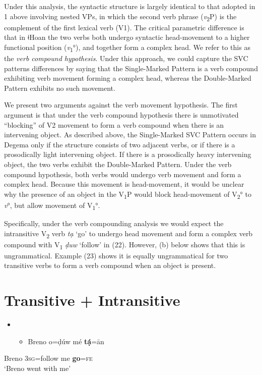 \documentclass[output=paper]{langsci/langscibook}
\begin{document}
Under this analysis, the syntactic structure is largely identical to that adopted in 1 above involving nested VPs, in which the second verb phrase (\textit{v}\textsubscript{2}P) is the complement of the first lexical verb (V1). The critical parametric difference is that in ǂHoan the two verbs both undergo syntactic head-movement to a higher functional position (\textit{v}\textsubscript{1}°), and together form a complex head. We refer to this as the \textit{verb compound hypothesis}. Under this approach, we could capture the SVC patterns differences by saying that the Single-Marked Pattern is a verb compound exhibiting verb movement forming a complex head, whereas the Double-Marked Pattern exhibits no such movement. 

We present two arguments against the verb movement hypothesis. The first argument is that under the verb compound hypothesis there is unmotivated “blocking” of V2 movement to form a verb compound when there is an intervening object. As described above, the Single-Marked SVC Pattern occurs in Degema only if the structure consists of two adjacent verbs, or if there is a prosodically light intervening object. If there is a prosodically heavy intervening object, the two verbs exhibit the Double-Marked Pattern. Under the verb compound hypothesis, both verbs would undergo verb movement and form a complex head. Because this movement is head-movement, it would be unclear why the presence of an object in the V\textsubscript{1}P would block head-movement of V\textsubscript{2}° to \textit{v}°, but allow movement of V\textsubscript{1}°.

Specifically, under the verb compounding analysis we would expect the intransitive V\textsubscript{2} verb \textit{tạ }‘go’ to undergo head movement and form a complex verb compound with V\textsubscript{1} \textit{ḍuw} ‘follow’ in (22). However, (b) below shows that this is ungrammatical. Example (23) shows it is equally ungrammatical for two transitive verbs to form a verb compound when an object is present. 

\chapter[Transitive + Intransitive]{Transitive + Intransitive}
\label{bkm:Ref419990324}\begin{itemize}
\item \setcounter{itemize}{0}
\begin{itemize}
\item \gll Breno   o=ḍúw    mé   \textbf{tạ́}=\={a}n\\
\end{itemize}
\end{itemize}
     Breno   3\textsc{sg}=follow   me   \textbf{go}=\textsc{fe}\\
\glt ‘Breno went with me’ \citep[115]{Kari2004}
\z
\end{document}
